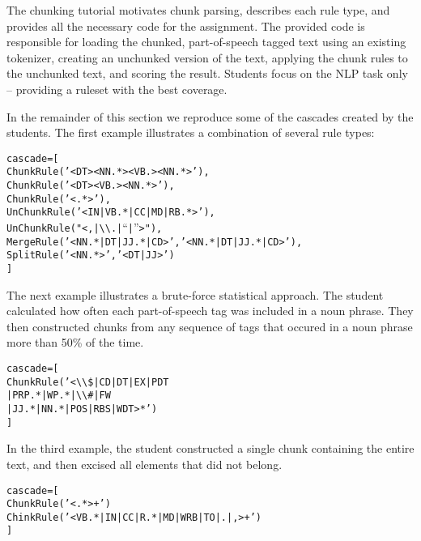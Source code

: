 \documentclass[11pt]{article}
\newenvironment{sv}{\scriptsize\begin{alltt}}{\end{alltt}\normalsize}
\begin{document}
The chunking tutorial motivates chunk parsing, describes each rule
type, and provides all the necessary code for the assignment.  The
provided code is responsible for loading the chunked, part-of-speech
tagged text using an existing tokenizer, creating an unchunked version
of the text, applying the chunk rules to the unchunked text, and
scoring the result.  Students focus on the NLP task only -- providing
a ruleset with the best coverage.

In the remainder of this section we reproduce some of the cascades
created by the students.  The first example illustrates a combination
of several rule types:

\begin{sv}
cascade = [
  ChunkRule('<DT><NN.*><VB.><NN.*>'),
  ChunkRule('<DT><VB.><NN.*>'),
  ChunkRule('<.*>'),
  UnChunkRule('<IN|VB.*|CC|MD|RB.*>'),
  UnChunkRule("<,|{\textbackslash}{\textbackslash}.|``|''>"),
  MergeRule('<NN.*|DT|JJ.*|CD>', '<NN.*|DT|JJ.*|CD>'),
  SplitRule('<NN.*>', '<DT|JJ>')
]
\end{sv}

The next example illustrates a brute-force statistical approach.  The
student calculated how often each part-of-speech tag was included in a
noun phrase.  They then constructed chunks from any sequence of tags
that occured in a noun phrase more than 50\% of the time.

\begin{sv}
cascade = [
  ChunkRule('<{\textbackslash}{\textbackslash}\$|CD|DT|EX|PDT
             |PRP.*|WP.*|{\textbackslash}{\textbackslash}\#|FW
             |JJ.*|NN.*|POS|RBS|WDT>*')
]
\end{sv}

In the third example, the student constructed a single chunk
containing the entire text, and then excised all elements that did not
belong.

\begin{sv}
cascade = [
  ChunkRule('<.*>+')
  ChinkRule('<VB.*|IN|CC|R.*|MD|WRB|TO|.|,>+')
]
\end{sv}


%
\end{document}

